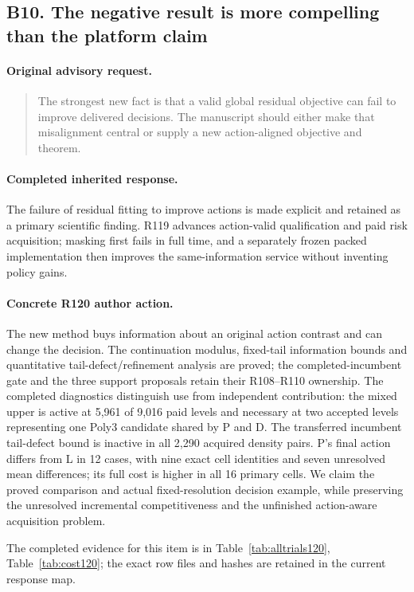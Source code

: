 \subsection{B10. The negative result is more compelling than the platform claim}
\label{response120:B10}
\paragraph{Original advisory request.}
\begin{quote}
The strongest new fact is that a valid global residual objective can fail to improve delivered decisions. The manuscript should either make that misalignment central or supply a new action-aligned objective and theorem.
\end{quote}
\paragraph{Completed inherited response.}
The failure of residual fitting to improve actions is made explicit and retained as a primary scientific finding. R119 advances action-valid qualification and paid risk acquisition; masking first fails in full time, and a separately frozen packed implementation then improves the same-information service without inventing policy gains.
\paragraph{Concrete R120 author action.}
The new method buys information about an original action contrast and can change the decision. The continuation modulus, fixed-tail information bounds and quantitative tail-defect/refinement analysis are proved; the completed-incumbent gate and the three support proposals retain their R108--R110 ownership. The completed diagnostics distinguish use from independent contribution: the mixed upper is active at 5,961 of 9,016 paid levels and necessary at two accepted levels representing one Poly3 candidate shared by P and D. The transferred incumbent tail-defect bound is inactive in all 2,290 acquired density pairs. P's final action differs from L in 12 cases, with nine exact cell identities and seven unresolved mean differences; its full cost is higher in all 16 primary cells. We claim the proved comparison and actual fixed-resolution decision example, while preserving the unresolved incremental competitiveness and the unfinished action-aware acquisition problem.

The completed evidence for this item is in Table~\ref{tab:alltrials120}, Table~\ref{tab:cost120}; the exact row files and hashes are retained in the current response map.
